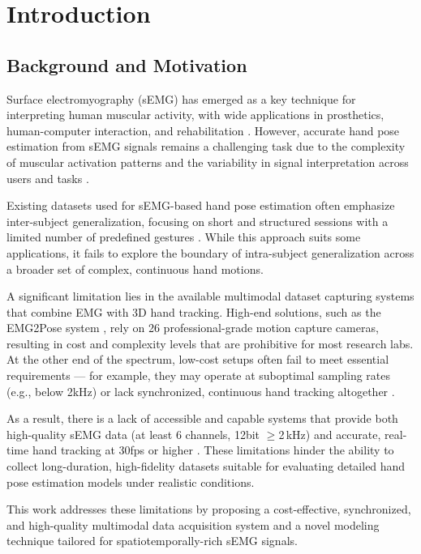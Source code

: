 \chapter{Introduction}
\label{chap:intro}

\section{Background and Motivation}

Surface electromyography (sEMG) has emerged as a key technique for interpreting human muscular activity, with wide applications in prosthetics, human-computer interaction, and rehabilitation \cite{zheng2022surface, simao2019review}. However, accurate hand pose estimation from sEMG signals remains a challenging task due to the complexity of muscular activation patterns and the variability in signal interpretation across users and tasks \cite{farago2022review, zia2018multiday}.

Existing datasets used for sEMG-based hand pose estimation often emphasize inter-subject generalization, focusing on short and structured sessions with a limited number of predefined gestures \cite{salter2024emg2pose}. While this approach suits some applications, it fails to explore the boundary of intra-subject generalization across a broader set of complex, continuous hand motions.

A significant limitation lies in the available multimodal dataset capturing systems that combine EMG with 3D hand tracking. High-end solutions, such as the EMG2Pose system \cite{salter2024emg2pose}, rely on 26 professional-grade motion capture cameras, resulting in cost and complexity levels that are prohibitive for most research labs. At the other end of the spectrum, low-cost setups often fail to meet essential requirements — for example, they may operate at suboptimal sampling rates (e.g., below 2kHz) or lack synchronized, continuous hand tracking altogether \cite{nasri2020semg}.

As a result, there is a lack of accessible and capable systems that provide both high-quality sEMG data (at least 6 channels, 12bit $\geq$2\,kHz) and accurate, real-time hand tracking at 30fps or higher \cite{graf2023combining}. These limitations hinder the ability to collect long-duration, high-fidelity datasets suitable for evaluating detailed hand pose estimation models under realistic conditions.

This work addresses these limitations by proposing a cost-effective, synchronized, and high-quality multimodal data acquisition system and a novel modeling technique tailored for spatiotemporally-rich sEMG signals.

